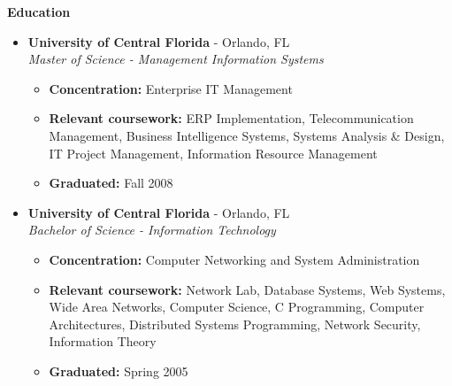 \documentclass[10pt,oneside]{article}
\newenvironment{ressection}[1]{
  \vspace{4pt}
  \textbf{\selectfont\normalsize#1}
  \begin{itemize}
  \vspace{3pt}
}{
  \end{itemize}
}
\newcommand{\resitem}[1]{
  \vspace{-4pt}
  \item \begin{flushleft} #1 \end{flushleft}
}
\newcommand{\ressubitem}[1]{
  \vspace{-1pt}
  \item \begin{flushleft} #1 \end{flushleft}
}
\newcommand{\resbigitem}[3]{
  \vspace{-5pt}
  \item
  \textbf{#1} - #2 \\
  \textit{#3}
}
\newenvironment{ressubsec}[3]{
  \resbigitem{#1}{#2}{#3}
  \vspace{-2pt}
  \begin{itemize}
}{
  \end{itemize}
}
\begin{document}
\begin{ressection}{Education}

  \begin{ressubsec}{University of Central Florida}{Orlando, FL}{Master of Science - Management Information Systems}

    \ressubitem{\textbf{Concentration:} Enterprise IT Management}
    
    \ressubitem{\textbf{Relevant coursework:} ERP Implementation, Telecommunication Management, Business Intelligence Systems, Systems Analysis \& Design, IT Project Management, Information Resource Management}

    \ressubitem{\textbf{Graduated:} Fall 2008}

  \end{ressubsec}

  \begin{ressubsec}{University of Central Florida}{Orlando, FL}{Bachelor of Science - Information Technology}

    \ressubitem{\textbf{Concentration:} Computer Networking and System Administration}
    
    \ressubitem{\textbf{Relevant coursework:} Network Lab, Database Systems, Web Systems, Wide Area Networks, Computer Science, C Programming, Computer Architectures, Distributed Systems Programming, Network Security, Information Theory}

    \ressubitem{\textbf{Graduated:} Spring 2005}

  \end{ressubsec}

\end{ressection}



  






\end{document}
